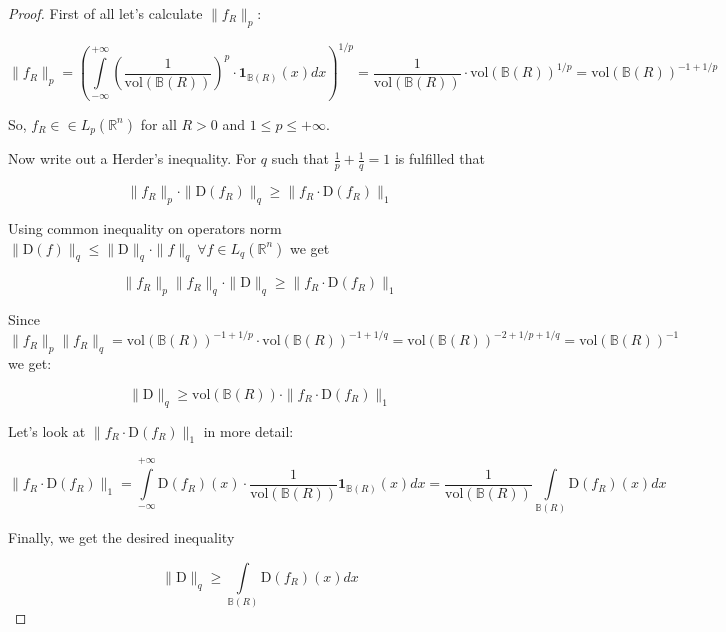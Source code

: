 \documentclass{article}
\begin{document}
    \begin{proof}
        First of all let's calculate $\|f_R\|_p$:

        \begin{equation*}
            \|f_R\|_p = \left(\int\limits_{-\infty}^{+\infty}\left(\dfrac{1}{\text{vol}(\mathbb{B}(R))}\right)^p \cdot \textbf{1}_{\mathbb{B}(R)}(x) dx\right)^{1/p} = \dfrac{1}{\text{vol}(\mathbb{B}(R))} \cdot \text{vol}(\mathbb{B}(R))^{1/p} = \text{vol}(\mathbb{B}(R))^{-1 + 1/p}
        \end{equation*}

        So, $f_R \in \in L_p(\mathbb{R}^n)$ for all $R > 0$ and $1 \leq p \leq +\infty$. 

        Now write out a Herder's inequality. For $q$ such that $\frac{1}{p} + \frac{1}{q} = 1$ is fulfilled that

        \begin{equation*}
            \|f_R\|_p \cdot \|\text{D}(f_R)\|_q \geq \|f_R \cdot \text{D}(f_R)\|_1
        \end{equation*}

        Using common inequality on operators norm $\|\text{D}(f)\|_q \leq \|\text{D}\|_q \cdot \|f\|_q ~\forall f \in L_q(\mathbb{R}^n)$ we get

        \begin{equation*}
            \|f_R\|_p \|f_R\|_q \cdot \|\text{D}\|_q \geq \|f_R \cdot \text{D}(f_R)\|_1
        \end{equation*}

        Since $\|f_R\|_p \|f_R\|_q = \text{vol}(\mathbb{B}(R))^{-1 + 1/p} \cdot \text{vol}(\mathbb{B}(R))^{-1 + 1/q} = \text{vol}(\mathbb{B}(R))^{-2 + 1/p + 1/q} = \text{vol}(\mathbb{B}(R))^{-1}$ we get:

        \begin{equation*}
            \|\text{D}\|_q \geq \text{vol}(\mathbb{B}(R)) \cdot \|f_R \cdot \text{D}(f_R)\|_1
        \end{equation*}

        Let's look at $\|f_R \cdot \text{D}(f_R)\|_1$ in more detail:

        \begin{equation*}
            \|f_R \cdot \text{D}(f_R)\|_1 = \int\limits_{-\infty}^{+\infty} \text{D}(f_R)(x) \cdot \dfrac{1}{\text{vol}(\mathbb{B}(R))} \textbf{1}_{\mathbb{B}(R)}(x) dx = \dfrac{1}{\text{vol}(\mathbb{B}(R))} \int\limits_{\mathbb{B}(R)} \text{D}(f_R)(x)dx
        \end{equation*}

        Finally, we get the desired inequality

        \begin{equation*}
            \|\text{D}\|_q \geq \int\limits_{\mathbb{B}(R)} \text{D}(f_R)(x)dx
        \end{equation*}
    \end{proof}
        
\end{document}

